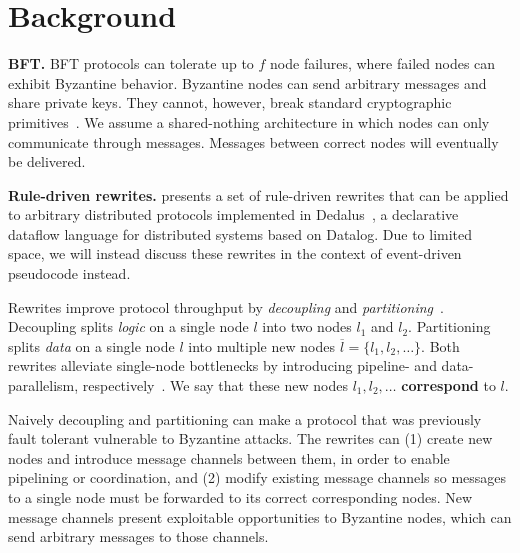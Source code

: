 \section{Background}
\label{sec:background}

\textbf{BFT.}
BFT protocols can tolerate up to $f$ node failures, where failed nodes can exhibit Byzantine behavior. 
Byzantine nodes can send arbitrary messages and share private keys. They cannot, however, break standard cryptographic primitives~\cite{pbft}.
We assume a shared-nothing architecture in which nodes can only communicate through messages.
Messages between correct nodes will eventually be delivered.

\textbf{Rule-driven rewrites.}
\sigmodpaper{} presents a set of rule-driven rewrites that can be applied to arbitrary distributed protocols implemented in Dedalus~\cite{dedalus}, a declarative dataflow language for distributed systems based on Datalog.
Due to limited space, we will instead discuss these rewrites in the context of event-driven pseudocode instead.

Rewrites improve protocol throughput by \emph{decoupling} and \emph{partitioning}~\cite{compartmentalized}.
Decoupling splits \emph{logic} on a single node $l$ into two nodes $l_1$ and $l_2$.
Partitioning splits \emph{data} on a single node $l$ into multiple new nodes $\overline{l} = \{l_1, l_2, \ldots\}$.
Both rewrites alleviate single-node bottlenecks by introducing pipeline- and data- parallelism, respectively~\cite{autocomp}.
We say that these new nodes $l_1, l_2, \ldots$ \textbf{correspond} to $l$.

Naively decoupling and partitioning can make a protocol that was previously fault tolerant vulnerable to Byzantine attacks.
The rewrites can (1) create new nodes and introduce message channels between them, in order to enable pipelining or coordination, and (2) modify existing message channels so messages to a single node must be forwarded to its correct corresponding nodes.
New message channels present exploitable opportunities to Byzantine nodes, which can send arbitrary messages to those channels.


